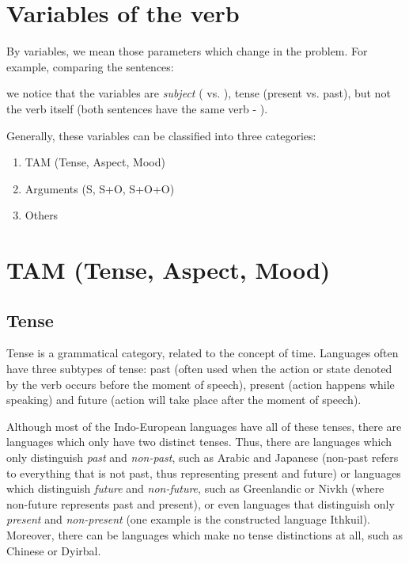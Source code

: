 \begin{refsection}
\section{Variables of the verb}\largerpage[2]

By variables, we mean those parameters which change in the problem. For example, comparing the sentences:


\noindent we notice that the variables are \textit{subject} ( vs. ), tense (present vs. past), but not the verb itself (both sentences have the same verb - ).

Generally, these variables can be classified into three categories:

\begin{enumerate}
    \item TAM (Tense, Aspect, Mood)
    \item Arguments (S, S+O, S+O+O) 
    \item Others
\end{enumerate}

\section{TAM (Tense, Aspect, Mood)} 
\subsection{Tense} 
Tense is a grammatical category, related to the concept of time. Languages often have three subtypes of tense: past (often used when the action or state denoted by the verb occurs before the moment of speech), present (action happens while speaking) and future (action will take place after the moment of speech).

Although most of the Indo-European languages have all of these tenses, there are languages which only have two distinct tenses. Thus, there are languages which only distinguish \textit{past} and \textit{non-past}, such as Arabic and Japanese (non-past refers to everything that is not past, thus representing present and future) or languages which distinguish \textit{future} and \textit{non-future}, such as Greenlandic or Nivkh (where non-future represents past and present), or even languages that distinguish only \textit{present} and \textit{non-present} (one example is the constructed language Ithkuil). Moreover, there can be languages which make no tense distinctions at all, such as Chinese or Dyirbal.


\end{refsection}

